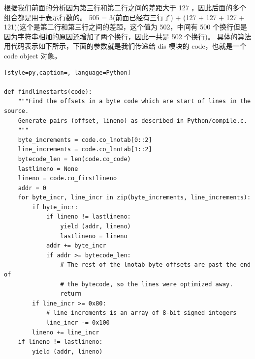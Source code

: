 根据我们前面的分析因为第三行和第二行之间的差距大于 127 ，因此后面的多个组合都是用于表示行数的。
505 = 3(前面已经有三行了) + (127 + 127 + 127 + 121)(这个是第二行和第三行之间的差距，这个值为 502，中间有 500 个换行但是因为字符串相加的原因还增加了两个换行，因此一共是 502 个换行)。
具体的算法用代码表示如下所示，下面的参数就是我们传递给 dis 模块的 code，也就是一个 code object 对象。
\begin{lstlisting}[style=py,caption=, language=Python]

def findlinestarts(code):
    """Find the offsets in a byte code which are start of lines in the source.
    Generate pairs (offset, lineno) as described in Python/compile.c.
    """
    byte_increments = code.co_lnotab[0::2]
    line_increments = code.co_lnotab[1::2]
    bytecode_len = len(code.co_code)
    lastlineno = None
    lineno = code.co_firstlineno
    addr = 0
    for byte_incr, line_incr in zip(byte_increments, line_increments):
        if byte_incr:
            if lineno != lastlineno:
                yield (addr, lineno)
                lastlineno = lineno
            addr += byte_incr
            if addr >= bytecode_len:
                # The rest of the lnotab byte offsets are past the end of
                # the bytecode, so the lines were optimized away.
                return
        if line_incr >= 0x80:
            # line_increments is an array of 8-bit signed integers
            line_incr -= 0x100
        lineno += line_incr
    if lineno != lastlineno:
        yield (addr, lineno)
\end{lstlisting}
